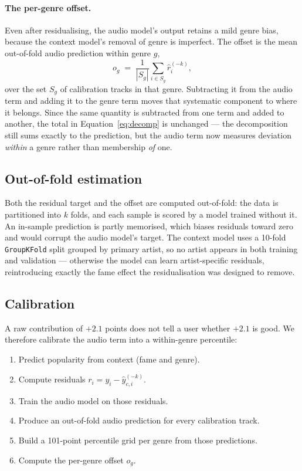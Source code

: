 \documentclass[10pt,twocolumn]{article}
\begin{document}
\paragraph{The per-genre offset.} Even after residualising, the audio model's
output retains a mild genre bias, because the context model's removal of genre is
imperfect. The offset is the mean out-of-fold audio prediction within genre $g$,
\begin{equation}
o_g \;=\; \frac{1}{|S_g|}\sum_{i \in S_g} \hat{r}^{(-k)}_i ,
\end{equation}
over the set $S_g$ of calibration tracks in that genre. Subtracting it from the
audio term and adding it to the genre term moves that systematic component to
where it belongs. Since the same quantity is subtracted from one term and added
to another, the total in Equation~\ref{eq:decomp} is unchanged --- the
decomposition still sums exactly to the prediction, but the audio term now
measures deviation \emph{within} a genre rather than membership \emph{of} one.

\subsection{Out-of-fold estimation}

Both the residual target and the offset are computed out-of-fold: the data is
partitioned into $k$ folds, and each sample is scored by a model trained without
it. An in-sample prediction is partly memorised, which biases residuals toward
zero and would corrupt the audio model's target. The context model uses a
10-fold \texttt{GroupKFold} split grouped by primary artist, so no artist appears
in both training and validation --- otherwise the model can learn
artist-specific residuals, reintroducing exactly the fame effect the
residualisation was designed to remove.

\subsection{Calibration}

A raw contribution of $+2.1$ points does not tell a user whether $+2.1$ is good.
We therefore calibrate the audio term into a within-genre percentile:

\begin{enumerate}[leftmargin=*,topsep=2pt,itemsep=1pt]
  \item Predict popularity from context (fame and genre).
  \item Compute residuals $r_i = y_i - \hat{y}^{(-k)}_{c,i}$.
  \item Train the audio model on those residuals.
  \item Produce an out-of-fold audio prediction for every calibration track.
  \item Build a 101-point percentile grid per genre from those predictions.
  \item Compute the per-genre offset $o_g$.
\end{enumerate}
\end{document}
